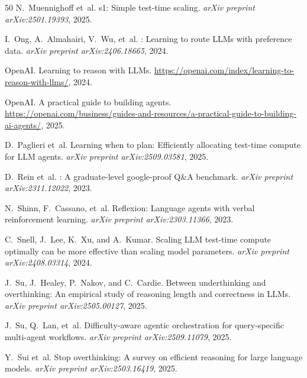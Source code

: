 \documentclass[11pt]{article}
\begin{document}
\begin{thebibliography}{50}
N.~Muennighoff et~al.
\newblock s1: Simple test-time scaling.
\newblock \emph{arXiv preprint arXiv:2501.19393}, 2025.

I.~Ong, A.~Almahairi, V.~Wu, et~al.
: Learning to route {LLMs} with preference data.
\newblock \emph{arXiv preprint arXiv:2406.18665}, 2024.

OpenAI.
\newblock Learning to reason with {LLMs}.
\newblock \url{https://openai.com/index/learning-to-reason-with-llms/}, 2024.

OpenAI.
\newblock A practical guide to building agents.
\newblock \url{https://openai.com/business/guides-and-resources/a-practical-guide-to-building-ai-agents/}, 2025.

D.~Paglieri et~al.
\newblock Learning when to plan: Efficiently allocating test-time compute for {LLM} agents.
\newblock \emph{arXiv preprint arXiv:2509.03581}, 2025.

D.~Rein et~al.
: A graduate-level google-proof {Q}\&{A} benchmark.
\newblock \emph{arXiv preprint arXiv:2311.12022}, 2023.

N.~Shinn, F.~Cassano, et~al.
\newblock Reflexion: Language agents with verbal reinforcement learning.
\newblock \emph{arXiv preprint arXiv:2303.11366}, 2023.

C.~Snell, J.~Lee, K.~Xu, and A.~Kumar.
\newblock Scaling {LLM} test-time compute optimally can be more effective than scaling model parameters.
\newblock \emph{arXiv preprint arXiv:2408.03314}, 2024.

J.~Su, J.~Healey, P.~Nakov, and C.~Cardie.
\newblock Between underthinking and overthinking: An empirical study of reasoning length and correctness in {LLMs}.
\newblock \emph{arXiv preprint arXiv:2505.00127}, 2025.

J.~Su, Q.~Lan, et~al.
\newblock Difficulty-aware agentic orchestration for query-specific multi-agent workflows.
\newblock \emph{arXiv preprint arXiv:2509.11079}, 2025.

Y.~Sui et~al.
\newblock Stop overthinking: A survey on efficient reasoning for large language models.
\newblock \emph{arXiv preprint arXiv:2503.16419}, 2025.


\end{thebibliography}
\end{document}
